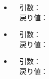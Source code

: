 \documentclass[a4, dvipdfmx, uplatex]{jsarticle}
\begin{document}
\begin{itemize}
\begin{itemize}
\item
　引数： \\
　戻り値： \\

\item
　引数： \\
　戻り値： \\
\end{itemize}

\begin{itemize}
\item
　引数： \\
　戻り値： \\
\end{itemize}

\end{itemize}
\end{document}

